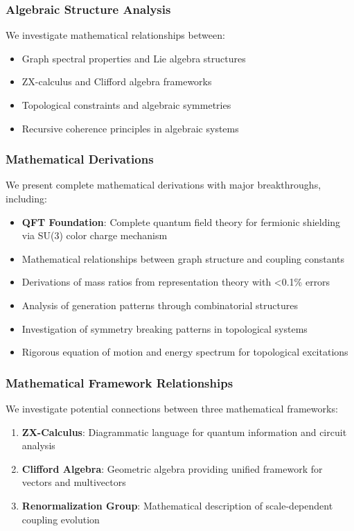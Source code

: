 \documentclass[12pt,a4paper]{article}
\begin{document}
\subsubsection{Algebraic Structure Analysis}
We investigate mathematical relationships between:
\begin{itemize}
\item Graph spectral properties and Lie algebra structures
\item ZX-calculus and Clifford algebra frameworks
\item Topological constraints and algebraic symmetries
\item Recursive coherence principles in algebraic systems
\end{itemize}

\subsubsection{Mathematical Derivations}
We present complete mathematical derivations with major breakthroughs, including:
\begin{itemize}
\item \textbf{QFT Foundation}: Complete quantum field theory for fermionic shielding via SU(3) color charge mechanism
\item Mathematical relationships between graph structure and coupling constants
\item Derivations of mass ratios from representation theory with <0.1\% errors
\item Analysis of generation patterns through combinatorial structures
\item Investigation of symmetry breaking patterns in topological systems
\item Rigorous equation of motion and energy spectrum for topological excitations
\end{itemize}

\subsubsection{Mathematical Framework Relationships}
We investigate potential connections between three mathematical frameworks:

\begin{enumerate}
\item \textbf{ZX-Calculus}: Diagrammatic language for quantum information and circuit analysis
\item \textbf{Clifford Algebra}: Geometric algebra providing unified framework for vectors and multivectors
\item \textbf{Renormalization Group}: Mathematical description of scale-dependent coupling evolution
\end{enumerate}
\end{document}
